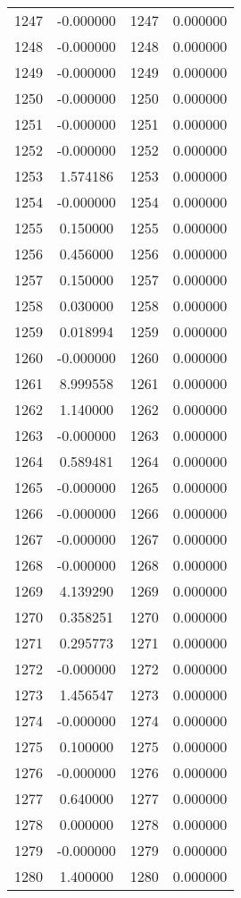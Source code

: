 \documentclass[12pt]{article}
\begin{document}
\begin{longtable}{@{}cccc@{}}
1247 & -0.000000 & 1247 & 0.000000 \\
1248 & -0.000000 & 1248 & 0.000000 \\
1249 & -0.000000 & 1249 & 0.000000 \\
1250 & -0.000000 & 1250 & 0.000000 \\
1251 & -0.000000 & 1251 & 0.000000 \\
1252 & -0.000000 & 1252 & 0.000000 \\
1253 & 1.574186 & 1253 & 0.000000 \\
1254 & -0.000000 & 1254 & 0.000000 \\
1255 & 0.150000 & 1255 & 0.000000 \\
1256 & 0.456000 & 1256 & 0.000000 \\
1257 & 0.150000 & 1257 & 0.000000 \\
1258 & 0.030000 & 1258 & 0.000000 \\
1259 & 0.018994 & 1259 & 0.000000 \\
1260 & -0.000000 & 1260 & 0.000000 \\
1261 & 8.999558 & 1261 & 0.000000 \\
1262 & 1.140000 & 1262 & 0.000000 \\
1263 & -0.000000 & 1263 & 0.000000 \\
1264 & 0.589481 & 1264 & 0.000000 \\
1265 & -0.000000 & 1265 & 0.000000 \\
1266 & -0.000000 & 1266 & 0.000000 \\
1267 & -0.000000 & 1267 & 0.000000 \\
1268 & -0.000000 & 1268 & 0.000000 \\
1269 & 4.139290 & 1269 & 0.000000 \\
1270 & 0.358251 & 1270 & 0.000000 \\
1271 & 0.295773 & 1271 & 0.000000 \\
1272 & -0.000000 & 1272 & 0.000000 \\
1273 & 1.456547 & 1273 & 0.000000 \\
1274 & -0.000000 & 1274 & 0.000000 \\
1275 & 0.100000 & 1275 & 0.000000 \\
1276 & -0.000000 & 1276 & 0.000000 \\
1277 & 0.640000 & 1277 & 0.000000 \\
1278 & 0.000000 & 1278 & 0.000000 \\
1279 & -0.000000 & 1279 & 0.000000 \\
1280 & 1.400000 & 1280 & 0.000000 \\

\end{longtable}
\end{document}

